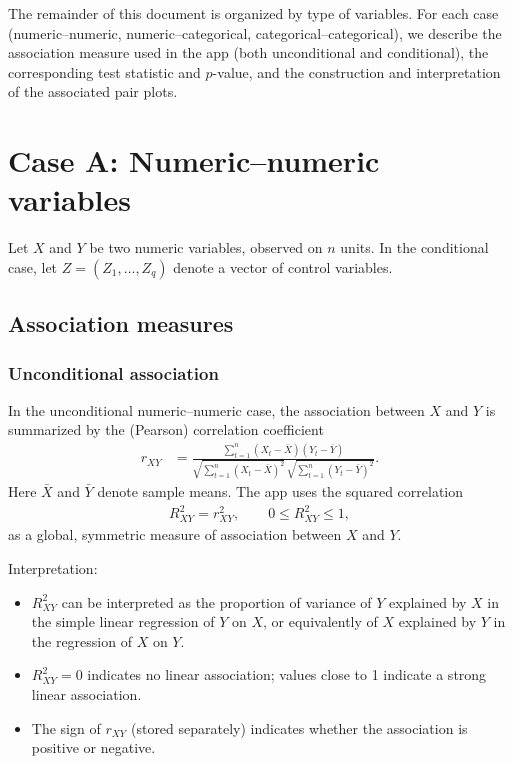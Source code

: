 \documentclass[11pt,a4paper]{article}
\begin{document}
\medskip

The remainder of this document is organized by type of variables. For each case (numeric--numeric, numeric--categorical, categorical--categorical), we describe the association measure used in the app (both unconditional and conditional), the corresponding test statistic and $p$-value, and the construction and interpretation of the associated pair plots.


\section{Case A: Numeric--numeric variables}

Let $X$ and $Y$ be two numeric variables, observed on $n$ units. In the conditional case, let $Z = (Z_1,\dots,Z_q)$ denote a vector of control variables.

\subsection{Association measures}

\subsubsection*{Unconditional association}

In the unconditional numeric--numeric case, the association between $X$ and $Y$ is summarized by the (Pearson) correlation coefficient
\begin{align}
r_{XY}
&=
\frac{
\sum_{t=1}^n (X_t - \bar{X})(Y_t - \bar{Y})
}{
\sqrt{\sum_{t=1}^n (X_t - \bar{X})^2}
\,
\sqrt{\sum_{t=1}^n (Y_t - \bar{Y})^2}
}.
\end{align}
Here $\bar{X}$ and $\bar{Y}$ denote sample means. The app uses the squared correlation
\begin{align}
R^2_{XY} = r_{XY}^2,
\qquad
0 \le R^2_{XY} \le 1,
\end{align}
as a global, symmetric measure of association between $X$ and $Y$.

Interpretation:
\begin{itemize}
\item $R^2_{XY}$ can be interpreted as the proportion of variance of $Y$ explained by $X$ in the simple linear regression of $Y$ on $X$, or equivalently of $X$ explained by $Y$ in the regression of $X$ on $Y$.
\item $R^2_{XY} = 0$ indicates no linear association; values close to 1 indicate a strong linear association.
\item The sign of $r_{XY}$ (stored separately) indicates whether the association is positive or negative.
\end{itemize}
\end{document}
